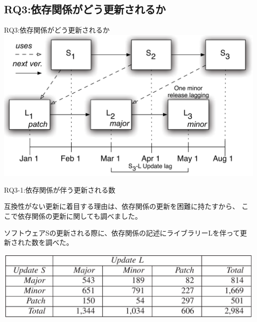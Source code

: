 \subsection{RQ3:依存関係がどう更新されるか}
\begin{frame}{RQ3:依存関係がどう更新されるか}
\includegraphics[width=\textwidth]{figure7}
\end{frame}
\begin{frame}{RQ3-1:依存関係が伴う更新される数}

{\small
互換性がない更新に着目する理由は、依存関係の更新を困難に持たすから、
ここで依存関係の更新に関しても調べました。
}

ソフトウェアSの更新される際に、依存関係の記述にライブラリーLを伴って更新された数を調べた。

\includegraphics[width=\textwidth]{table6}

\end{frame}
